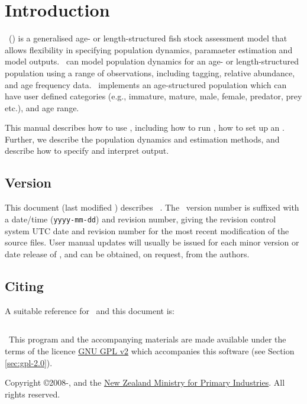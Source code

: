 \section{Introduction\label{sec:Introduction}}
\CNAME\ (\cname) is a generalised age- or length-structured fish stock assessment model that allows flexibility in specifying population dynamics, paramaeter estimation and model outputs. \CNAME\ can model population dynamics for an age- or length-structured population using a range of observations, including tagging, relative abundance, and age frequency data. \CNAME\ implements an age-structured population which can have user defined categories (e.g., immature, mature, male, female, predator, prey etc.), and age range. 

This manual describes how to use \CNAME, including how to run \CNAME, how to set up an \config. Further, we describe the population dynamics and estimation methods, and describe how to specify and interpret output. 

\subsection{Version\label{sec:version}}
This document (last modified \DocVer) describes \CNAME\ \VER. The \CNAME\ version number is suffixed with a date/time (\texttt{yyyy-mm-dd}) and revision number, giving the revision control system UTC date and revision number for the most recent modification of the source files. User manual updates will usually be issued for each minor version or date release of \CNAME, and can be obtained, on request, from the authors.

\subsection{Citing \CNAME}
A suitable reference for \CNAME\ and this document is:

\ManualRef{}

\subsection{}
\
This program and the accompanying materials are made available under the terms of the licence \href{http://www.gnu.org/licenses/old-licenses/gpl-2.0.en.html}{GNU GPL v2} which accompanies this software (see Section \ref{sec:gpl-2.0}).

Copyright \copyright 2008-\SourceControlYearDoc, \href{http://www.niwa.co.nz}{\Organisation} and the \href{http://www.mpi.govt.nz}{New Zealand Ministry for Primary Industries}. All rights reserved.

